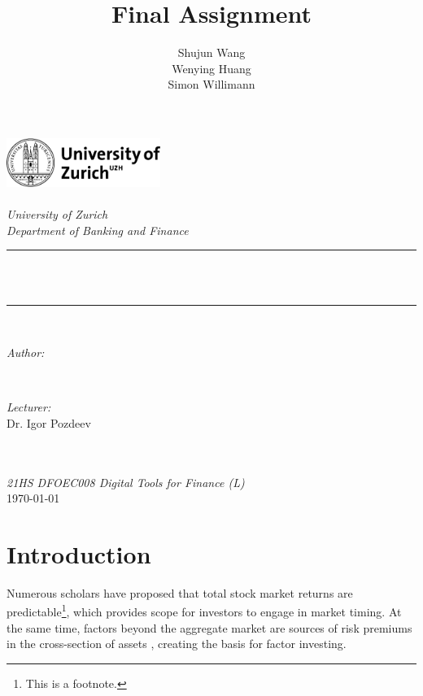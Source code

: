 \documentclass{article}
\title{Final Assignment}
\author{\textup{Shujun Wang\\
                Wenying Huang\\
                Simon Willimann}}
\begin{document}
\begin{titlepage}
	\newcommand{\HRule}{\rule{\linewidth}{0.5mm}}
	\includegraphics[width=5cm]{uzh_logo.png}\\[1cm] 
	\center 
	\quad\\[1.5cm]
	\textsl{\Large University of Zurich }\\[0.5cm] 
	\textsl{\large Department of Banking and Finance}\\[0.5cm] 
	\makeatletter
	\HRule \\[0.4cm]
	{ \huge \bfseries \@title}\\[0.4cm] 
	\HRule \\[1.5cm]
	\begin{minipage}{0.4\textwidth}
		\begin{flushleft} \large
			\emph{Author:}\\
			\@author 
		\end{flushleft}
	\end{minipage}
	~
	\begin{minipage}{0.4\textwidth}
		\begin{flushright} \large
			\emph{Lecturer:} \\
			\textup{Dr. Igor Pozdeev}
		\end{flushright}
	\end{minipage}\\[3cm]
	\makeatother
	{\large }\\[1cm]
	{\large \emph{21HS DFOEC008 Digital Tools for Finance (L)}}\\[0.5cm]
	{\large \today}\\[2cm] 
	\vfill 
\end{titlepage}

\tableofcontents

\newpage

\section{Introduction}
Numerous scholars have proposed that total stock market returns are predictable\footnote{This is a footnote.}, which provides scope for investors to engage in market timing. At the same time, factors beyond the aggregate market are sources of risk premiums in the cross-section of assets \cite{fama1993common}, creating the basis for
factor investing. 
\end{document}
